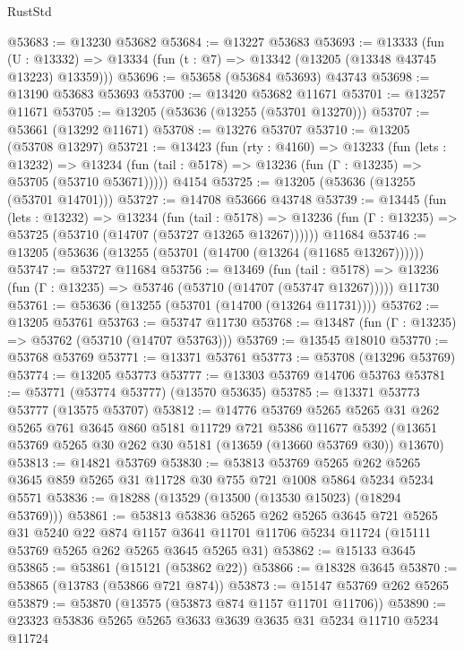 \begin{lexlean}{RustStd}
\begin{coremodule}
@53683 := @13230 @53682
@53684 := @13227 @53683
@53693 := @13333
    (fun (U : @13332) => @13334 (fun (t : @7) => @13342 (@13205 (@13348 @43745 @13223) @13359)))
@53696 := @53658 (@53684 @53693) @43743
@53698 := @13190 @53683 @53693
@53700 := @13420 @53682 @11671
@53701 := @13257 @11671
@53705 := @13205 (@53636 (@13255 (@53701 @13270)))
@53707 := @53661 (@13292 @11671)
@53708 := @13276 @53707
@53710 := @13205 (@53708 @13297)
@53721 := @13423
    (fun (rty : @4160) =>
    @13233
      (fun (lets : @13232) =>
      @13234 (fun (tail : @5178) => @13236 (fun (Γ : @13235) => @53705 (@53710 @53671)))))
    @4154
@53725 := @13205 (@53636 (@13255 (@53701 @14701)))
@53727 := @14708 @53666 @43748
@53739 := @13445
    (fun (lets : @13232) =>
    @13234
      (fun (tail : @5178) =>
      @13236 (fun (Γ : @13235) => @53725 (@53710 (@14707 (@53727 @13265 @13267))))))
    @11684
@53746 := @13205 (@53636 (@13255 (@53701 (@14700 (@13264 (@11685 @13267))))))
@53747 := @53727 @11684
@53756 := @13469
    (fun (tail : @5178) => @13236 (fun (Γ : @13235) => @53746 (@53710 (@14707 (@53747 @13267)))))
    @11730
@53761 := @53636 (@13255 (@53701 (@14700 (@13264 @11731))))
@53762 := @13205 @53761
@53763 := @53747 @11730
@53768 := @13487 (fun (Γ : @13235) => @53762 (@53710 (@14707 @53763)))
@53769 := @13545 @18010
@53770 := @53768 @53769
@53771 := @13371 @53761
@53773 := @53708 (@13296 @53769)
@53774 := @13205 @53773
@53777 := @13303 @53769 @14706 @53763
@53781 := @53771 (@53774 @53777) (@13570 @53635)
@53785 := @13371 @53773 @53777 (@13575 @53707)
@53812 := @14776
    @53769
    @5265
    @5265
    @31
    @262
    @5265
    @761
    @3645
    @860
    @5181
    @11729
    @721
    @5386
    @11677
    @5392
    (@13651 @53769 @5265 @30 @262 @30 @5181 (@13659 (@13660 @53769 @30)) @13670)
@53813 := @14821 @53769
@53830 := @53813
    @53769
    @5265
    @262
    @5265
    @3645
    @859
    @5265
    @31
    @11728
    @30
    @755
    @721
    @1008
    @5864
    @5234
    @5234
    @5571
@53836 := @18288 (@13529 (@13500 (@13530 @15023) (@18294 @53769)))
@53861 := @53813
    @53836
    @5265
    @262
    @5265
    @3645
    @721
    @5265
    @31
    @5240
    @22
    @874
    @1157
    @3641
    @11701
    @11706
    @5234
    @11724
    (@15111 @53769 @5265 @262 @5265 @3645 @5265 @31)
@53862 := @15133 @3645
@53865 := @53861 (@15121 (@53862 @22))
@53866 := @18328 @3645
@53870 := @53865 (@13783 (@53866 @721 @874))
@53873 := @15147 @53769 @262 @5265
@53879 := @53870 (@13575 (@53873 @874 @1157 @11701 @11706))
@53890 := @23323 @53836 @5265 @5265 @3633 @3639 @3635 @31 @5234 @11710 @5234 @11724

\end{coremodule}
\end{lexlean}
